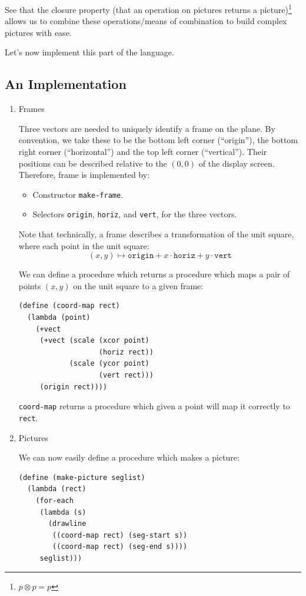 \documentclass[9pt]{report}
\begin{document}
See that the closure property (that an operation on pictures
returns a picture)\footnote{\(p \otimes p = p\)} allows us to combine these operations/means of
combination to build complex pictures with ease.

Let's now implement this part of the language.

\subsection{An Implementation}
\label{sec:org77b6205}

\begin{enumerate}
\item Frames
\label{sec:org17ea578}

Three vectors are needed to uniquely identify a frame on the
plane. By convention, we take these to be the bottom left corner
(``origin''), the bottom right corner (``horizontal'') and the top
left corner (``vertical''). Their positions can be described
relative to the \((0,0)\) of the display screen. Therefore,
frame is implemented by:
\begin{itemize}
\item Constructor \texttt{make-frame}.
\item Selectors \texttt{origin}, \texttt{horiz}, and \texttt{vert}, for the three vectors.
\end{itemize}

Note that technically, a frame describes a transformation of
the unit square, where each point in the unit square:
$$(x,y)\mapsto \mathtt{origin} + x\cdot \mathtt{horiz} + y\cdot
     \mathtt{vert}$$

We can define a procedure which returns a procedure which maps
a pair of points \((x,y)\) on the unit square to a given frame:

\begin{verbatim}
(define (coord-map rect)
  (lambda (point)
    (+vect
     (+vect (scale (xcor point)
                   (horiz rect))
            (scale (ycor point)
                   (vert rect)))
     (origin rect))))
\end{verbatim}

\texttt{coord-map} returns a procedure which given a point will map it
correctly to \texttt{rect}.

\item Pictures
\label{sec:orgbde5991}

We can now easily define a procedure which makes a picture:
\begin{verbatim}
(define (make-picture seglist)
  (lambda (rect)
    (for-each
     (lambda (s)
       (drawline
        ((coord-map rect) (seg-start s))
        ((coord-map rect) (seg-end s))))
     seglist)))
\end{verbatim}


\end{enumerate}
\end{document}
